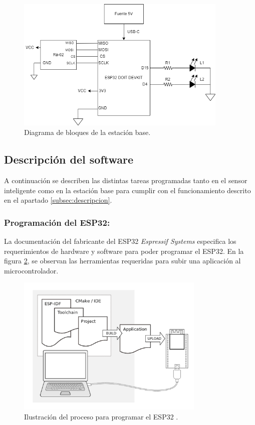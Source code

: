 \begin{figure}[H]
    \centering
    \includegraphics[width = 0.9\textwidth]{imagenes/cap2_marcometod/DiagramaHardwareEstacionBase.png}
    \caption{Diagrama de bloques de la estación base.}
    \label{fig:estacionbbloques}
\end{figure}

\subsection{Descripción del software}

A continuación se describen las distintas tareas programadas tanto en el sensor inteligente como en la estación base para cumplir con el funcionamiento descrito en el apartado \ref{subsec:descripcion}.

\subsubsection{Programación del ESP32:} 

La documentación del fabricante del ESP32 \textit{Espressif Systems} especifica los requerimientos de hardware y software para poder programar el ESP32. En la figura \ref{fig:toolchain}, se observan las herramientas requeridas para subir una aplicación al microcontrolador. 

\begin{figure}[H]
    \centering
    \includegraphics[width = 0.8\textwidth]{imagenes/cap2_marcometod/Toolchain.png}
    \caption{Ilustración del proceso para programar el ESP32 \citep{datasheetESP32}.}
    \label{fig:toolchain}
\end{figure}

